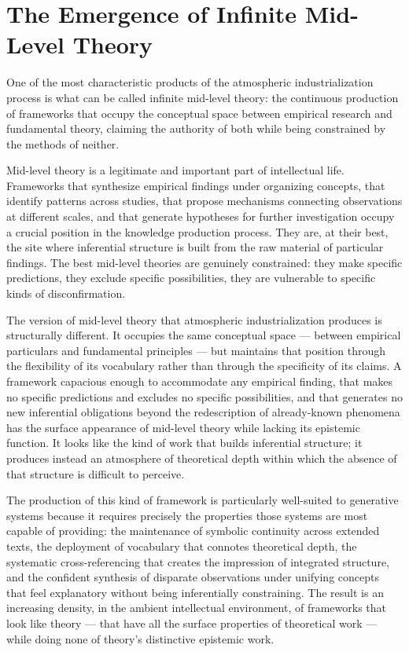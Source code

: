 \documentclass[12pt, openright, twoside]{book}
\begin{document}
\section{The Emergence of Infinite Mid-Level Theory}

One of the most characteristic products of the atmospheric
industrialization process is what can be called infinite mid-level
theory: the continuous production of frameworks that occupy the
conceptual space between empirical research and fundamental theory,
claiming the authority of both while being constrained by the
methods of neither.

Mid-level theory is a legitimate and important part of intellectual
life. Frameworks that synthesize empirical findings under organizing
concepts, that identify patterns across studies, that propose
mechanisms connecting observations at different scales, and that
generate hypotheses for further investigation occupy a crucial
position in the knowledge production process. They are, at their
best, the site where inferential structure is built from the raw
material of particular findings. The best mid-level theories are
genuinely constrained: they make specific predictions, they exclude
specific possibilities, they are vulnerable to specific kinds of
disconfirmation.

The version of mid-level theory that atmospheric industrialization
produces is structurally different. It occupies the same conceptual
space --- between empirical particulars and fundamental principles ---
but maintains that position through the flexibility of its vocabulary
rather than through the specificity of its claims. A framework
capacious enough to accommodate any empirical finding, that makes
no specific predictions and excludes no specific possibilities,
and that generates no new inferential obligations beyond the
redescription of already-known phenomena has the surface appearance
of mid-level theory while lacking its epistemic function. It looks
like the kind of work that builds inferential structure; it produces
instead an atmosphere of theoretical depth within which the absence
of that structure is difficult to perceive.

The production of this kind of framework is particularly well-suited
to generative systems because it requires precisely the properties
those systems are most capable of providing: the maintenance of
symbolic continuity across extended texts, the deployment of
vocabulary that connotes theoretical depth, the systematic
cross-referencing that creates the impression of integrated
structure, and the confident synthesis of disparate observations
under unifying concepts that feel explanatory without being
inferentially constraining. The result is an increasing density,
in the ambient intellectual environment, of frameworks that look
like theory --- that have all the surface properties of theoretical
work --- while doing none of theory's distinctive epistemic work.
\end{document}
